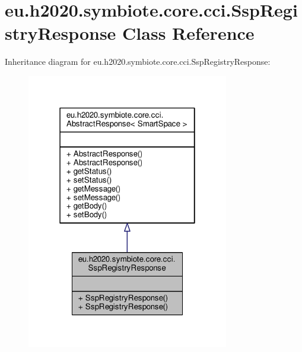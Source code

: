 \hypertarget{classeu_1_1h2020_1_1symbiote_1_1core_1_1cci_1_1SspRegistryResponse}{}\section{eu.\+h2020.\+symbiote.\+core.\+cci.\+Ssp\+Registry\+Response Class Reference}
\label{classeu_1_1h2020_1_1symbiote_1_1core_1_1cci_1_1SspRegistryResponse}


Inheritance diagram for eu.\+h2020.\+symbiote.\+core.\+cci.\+Ssp\+Registry\+Response\+:
\nopagebreak
\begin{figure}[H]
\begin{center}
\leavevmode
\includegraphics[width=250pt]{classeu_1_1h2020_1_1symbiote_1_1core_1_1cci_1_1SspRegistryResponse__inherit__graph}
\end{center}
\end{figure}


